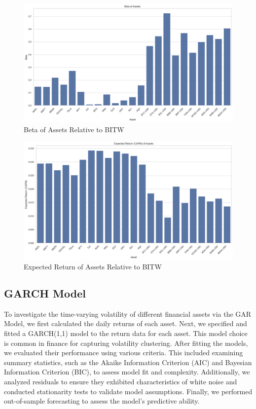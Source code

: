 \begin{figure}
    \centering
    \includegraphics[width=\textwidth]{./code/risk-and-return-analysis/capm/beta_assets.png}
    \caption{Beta of Assets Relative to BITW}
    \label{fig:beta}
\end{figure}

\begin{figure}
    \centering
    \includegraphics[width=\textwidth]{./code/risk-and-return-analysis/capm/exp_return_assets.png}
    \caption{Expected Return of Assets Relative to BITW}
    \label{fig:exp_return}
\end{figure}


\pagebreak
\subsection{GARCH Model}

To investigate the time-varying volatility of different financial assets via the GAR Model, we first calculated the daily returns of each asset. Next, we specified and fitted a GARCH(1,1) model to the return data for each asset. This model choice is common in finance for capturing volatility clustering. After fitting the models, we evaluated their performance using various criteria. This included examining summary statistics, such as the Akaike Information Criterion (AIC) and Bayesian Information Criterion (BIC), to assess model fit and complexity. Additionally, we analyzed residuals to ensure they exhibited characteristics of white noise and conducted stationarity tests to validate model assumptions. Finally, we performed out-of-sample forecasting to assess the model's predictive ability.

